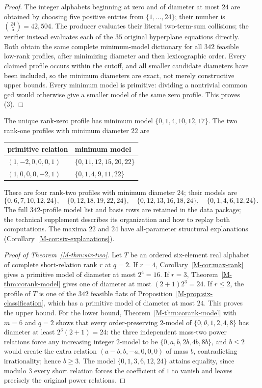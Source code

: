 \documentclass[11pt,reqno]{amsart}
\theoremstyle{plain}
\theoremstyle{definition}
\theoremstyle{plain}
\theoremstyle{plain}
\theoremstyle{plain}
\theoremstyle{plain}
\theoremstyle{plain}
\theoremstyle{plain}
\theoremstyle{definition}
\theoremstyle{definition}
\theoremstyle{definition}
\theoremstyle{plain}
\begin{document}
\begin{proof}
The integer alphabets beginning at zero and of diameter at most $24$ are
obtained by choosing five positive entries from $\{1,\ldots,24\}$; their
number is $\binom{24}5=42{,}504$. The producer evaluates their literal
two-term-sum collisions; the verifier instead evaluates each of the $35$
original hyperplane equations directly. Both obtain the same complete
minimum-model dictionary for all $342$ feasible low-rank profiles, after
minimizing diameter and then lexicographic order. Every claimed profile
occurs within the cutoff, and all smaller candidate diameters have been
included, so the minimum diameters are exact, not merely constructive upper
bounds. Every minimum model is primitive: dividing a nontrivial common gcd
would otherwise give a smaller model of the same zero profile. This proves
(3).
\end{proof}

The unique rank-zero profile has minimum model $\{0,1,4,10,12,17\}$. The two
rank-one profiles with minimum diameter $22$ are
\begin{center}
\begin{tabular}{@{}ll@{}}
\toprule
primitive relation & minimum model\\
\midrule
$(1,-2,0,0,0,1)$ & $\{0,11,12,15,20,22\}$\\
$(1,0,0,0,-2,1)$ & $\{0,1,4,9,11,22\}$\\
\bottomrule
\end{tabular}
\end{center}
There are four rank-two profiles with minimum diameter $24$; their models
are
\[
 \{0,6,7,10,12,24\},\quad
 \{0,12,18,19,22,24\},\quad
 \{0,12,13,16,18,24\},\quad
 \{0,1,4,6,12,24\}.
\]
The full $342$-profile model list and basis rows are retained in the data
package; the technical supplement describes its organization and how to
replay both computations. The maxima $22$ and $24$ have all-parameter
structural explanations (Corollary~\ref{M-cor:six-explanations}).

\begin{proof}[Proof of Theorem~\ref{M-thm:six-two}]
Let $T$ be an ordered six-element real alphabet of complete short-relation
rank $r$ at $q=2$. If $r=4$, Corollary~\ref{M-cor:max-rank} gives a primitive
model of diameter at most $2^4=16$. If $r=3$, Theorem~\ref{M-thm:corank-model}
gives one of diameter at most $(2+1)2^3=24$. If $r\le2$, the profile of $T$
is one of the $342$ feasible flats of
Proposition~\ref{M-prop:six-classification}, which has a primitive model of
diameter at most $24$. This proves the upper bound. For the lower bound,
Theorem~\ref{M-thm:corank-model} with $m=6$ and $q=2$ shows that every
order-preserving $2$-model of $\{0,\theta,1,2,4,8\}$ has diameter at least
$2^3(2+1)=24$: the three independent mass-two power relations force any
increasing integer $2$-model to be $\{0,a,b,2b,4b,8b\}$, and $b\le2$ would
create the extra relation $(a-b,b,-a,0,0,0)$ of mass $b$, contradicting
irrationality; hence $b\ge3$. The model $\{0,1,3,6,12,24\}$ attains equality,
since modulo $3$ every short relation forces the coefficient of $1$ to vanish
and leaves precisely the original power relations.
\end{proof}
\end{document}
